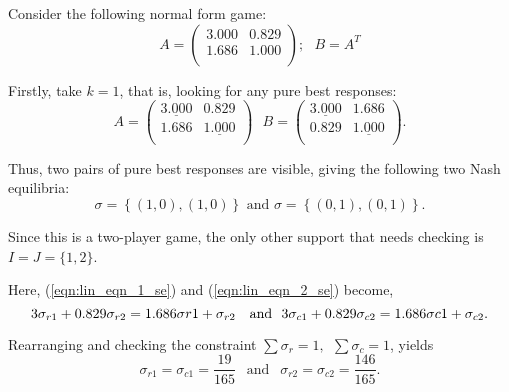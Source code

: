 Consider the following normal form game:
\begin{equation}\label{eqn:supp_en_ex}
    A = \begin{pmatrix}
        3.000 & 0.829 \\
        1.686 & 1.000 \\
    \end{pmatrix}; ~~~
    B = A^{T}
\end{equation}

Firstly, take \(k = 1\), that is, looking for any pure best responses:
\begin{displaymath}
    A = \begin{pmatrix}
        \underline{3.000} & 0.829 \\
        1.686 & \underline{1.000} \\
    \end{pmatrix} ~~~ B = \begin{pmatrix}
        \underline{3.000} & 1.686 \\
        0.829 & \underline{1.000} \\
    \end{pmatrix}.
\end{displaymath}

Thus, two pairs of pure best responses are visible, giving the following two
Nash equilibria:
\begin{displaymath}
    \sigma = \left \{(1, 0), (1, 0)\right \} \text{   and   } \sigma = \left \{(0, 1), (0, 1)\right \}.
\end{displaymath}

Since this is a two-player game, the only other support that needs checking is
\(I = J = \{1, 2\} \). 

Here, (\ref{eqn:lin_eqn_1_se}) and (\ref{eqn:lin_eqn_2_se}) become,
\begin{displaymath}
    3\sigma_{r1} + 0.829\sigma_{r2} = 1.686\sigma{r1} + \sigma_{r2} ~~ \text{   and   } ~~ \\
    3\sigma_{c1} + 0.829\sigma_{c2} = 1.686\sigma{c1} + \sigma_{c2}.
\end{displaymath}

Rearranging and checking the constraint \(\sum{\sigma_{r} = 1}, ~~
\sum{\sigma_{c} = 1}\), yields 
\begin{displaymath}
    \sigma_{r1} = \sigma_{c1} = \frac{19}{165} ~~ \text{ and } ~~ \sigma_{r2} = \sigma_{c2} = \frac{146}{165}.
\end{displaymath}

